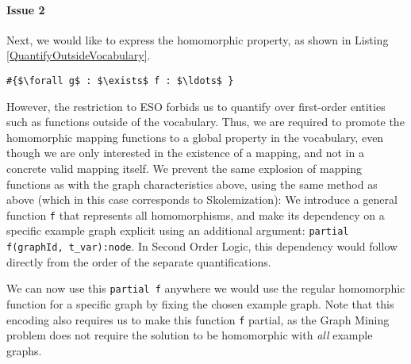 \documentclass{article}
\theoremstyle{definition}
\newcommand{\matthias}[1]{\textcolor{blue}{\marginpar{\sc Matthias} #1}}
\begin{document}


\paragraph{Issue 2}
Next, we would like to express the homomorphic property, as shown in Listing \ref{QuantifyOutsideVocabulary}.
\begin{lstlisting}[mathescape, caption=Quantifying over functions outside the vocabulary, label=QuantifyOutsideVocabulary,basicstyle=\fontfamily{lmvtt}\selectfont]
#{$\forall g$ : $\exists$ f : $\ldots$ }
\end{lstlisting}
However, the restriction to ESO forbids us to quantify over first-order entities such as functions outside of the vocabulary.
Thus, we are required to promote the homomorphic mapping functions to a global property in the vocabulary, even though we are only interested in the existence of a mapping, and not in a concrete valid mapping itself.
We prevent the same explosion of mapping functions as with the graph characteristics above, using the same method as above (which in this case corresponds to Skolemization):
We introduce a general function \verb|f| that represents all homomorphisms, and make its dependency on a specific example graph explicit using an additional argument:
\verb|partial f(graphId, t_var):node|.
In Second Order Logic, this dependency would follow directly from the order of the separate quantifications.

We can now use this \verb|partial f| anywhere we would use the regular homomorphic function for a specific graph by fixing the chosen example graph.
Note that this encoding also requires us to make this function \verb|f| partial, as the Graph Mining problem does not require the solution to be homomorphic with \emph{all} example graphs.
\end{document}
